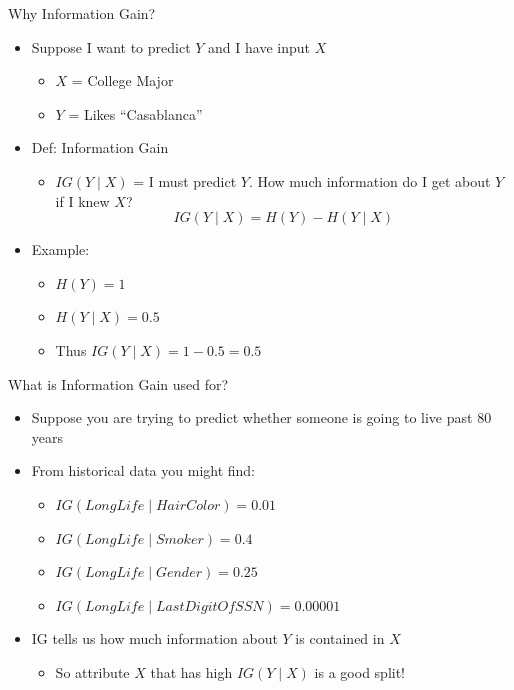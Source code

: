 \begin{frame}[allowframebreaks]{Why Information Gain?}

\begin{itemize}
  \item Suppose I want to predict $Y$ and I have input $X$
  \begin{itemize}
    \item $X$ = College Major
    \item $Y$ = Likes ``Casablanca''
  \end{itemize}

  \item Def: Information Gain
  \begin{itemize}
    \item $IG(Y \mid X)$ = I must predict $Y$. How much information do I get about $Y$ if I knew $X$?
    \[
    IG(Y \mid X) = H(Y) - H(Y \mid X)
    \]
  \end{itemize}
  
  \item Example:
  \begin{itemize}
    \item $H(Y) = 1$
    \item $H(Y \mid X) = 0.5$
    \item Thus $IG(Y \mid X) = 1 - 0.5 = 0.5$
  \end{itemize}
\end{itemize}


\end{frame}


\begin{frame}[allowframebreaks]{What is Information Gain used for?}

\begin{itemize}
  \item Suppose you are trying to predict whether someone is going to live past 80 years

  \item From historical data you might find:
  \begin{itemize}
    \item $IG(LongLife \mid HairColor) = 0.01$
    \item $IG(LongLife \mid Smoker) = 0.4$
    \item $IG(LongLife \mid Gender) = 0.25$
    \item $IG(LongLife \mid LastDigitOfSSN) = 0.00001$
  \end{itemize}

  \item IG tells us how much information about $Y$ is contained in $X$
  \begin{itemize}
    \item So attribute $X$ that has high $IG(Y \mid X)$ is a good split!
  \end{itemize}
\end{itemize}

\end{frame}


